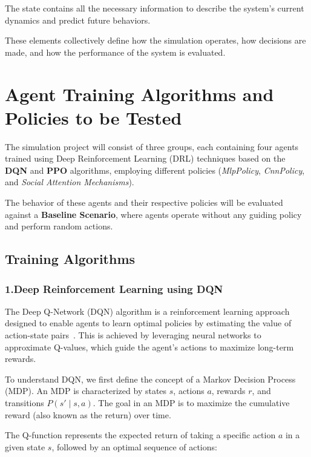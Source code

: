 The state contains all the necessary information to describe the system's current dynamics and predict future behaviors.
      
These elements collectively define how the simulation operates, how decisions are made, and how the performance of the system is evaluated.



\section{Agent Training Algorithms and Policies to be Tested}

The simulation project will consist of three groups, each containing four agents trained using Deep Reinforcement Learning (DRL) techniques based on the \textbf{DQN} and \textbf{PPO} algorithms, employing different policies (\textit{MlpPolicy}, \textit{CnnPolicy}, and \textit{Social Attention Mechanisms}).

The behavior of these agents and their respective policies will be evaluated against a \textbf{Baseline Scenario}, where agents operate without any guiding policy and perform random actions.

\subsection{Training Algorithms}

\subsubsection{1.Deep Reinforcement Learning using DQN}

The Deep Q-Network (DQN) algorithm is a reinforcement learning approach designed to enable agents to learn optimal policies by estimating the value of action-state pairs~\cite{mnih2015dqn}. This is achieved by leveraging neural networks to approximate Q-values, which guide the agent's actions to maximize long-term rewards.

To understand DQN, we first define the concept of a Markov Decision Process (MDP). An MDP is characterized by states \(s\), actions \(a\), rewards \(r\), and transitions \(P(s' \mid s, a)\). The goal in an MDP is to maximize the cumulative reward (also known as the return) over time.

The Q-function represents the expected return of taking a specific action \(a\) in a given state \(s\), followed by an optimal sequence of actions:

